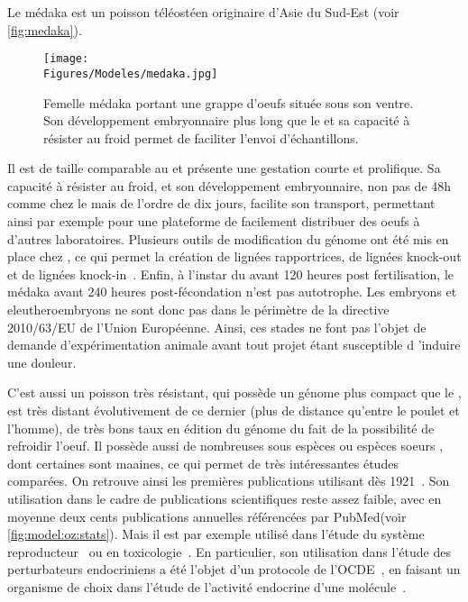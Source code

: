 \documentclass[\main/main.tex]{subfiles}
\begin{document}
%
Le médaka est un poisson téléostéen originaire d'Asie du Sud-Est (voir \autoref{fig:medaka}).

\begin{figure}[h!]
    \centering
    \texttt{[image: \\Figures/Modeles/medaka.jpg]}
    \caption{
    Femelle médaka portant une grappe d'oeufs située sous son ventre.
    \newline
    Son développement embryonnaire plus long que le \pz{} et sa capacité à résister au froid permet de faciliter l'envoi d'échantillons.
    }
    \label{fig:medaka}
\end{figure}

%
Il est de taille comparable au \pz{} et présente une gestation courte et prolifique.
%
Sa capacité à résister au froid, et son développement embryonnaire, non pas de 48h comme chez le \pz{} mais de l'ordre de dix jours,  facilite son transport, permettant ainsi par exemple pour une plateforme de facilement distribuer des oeufs à d'autres laboratoires.
%
Plusieurs outils de modification du génome ont été mis en place chez \ol{}\cite{kirchmaier_2015, ansai_2017},
ce qui permet la création de lignées rapportrices, de lignées knock-out et de lignées knock-in~\cite{abdelmoneim_2018,jin_2020,Watakabe_2018,qiu_2014,gay_2018}.
%
Enfin, à l'instar du \pz{} avant 120 heures post fertilisation,
le médaka avant 240 heures post-fécondation n'est pas autotrophe.
%
Les embryons et eleutheroembryons ne sont donc pas dans le périmètre de la directive 2010/63/EU de l'Union Européenne.
%
Ainsi, ces stades ne font pas l'objet de demande d'expérimentation animale avant tout projet étant susceptible d 'induire une douleur.

%
C'est aussi un poisson très résistant, qui possède un génome plus compact que le \pz{} , est très distant évolutivement de ce dernier (plus de distance qu'entre le poulet et l'homme), de très bons taux en édition du génome du fait de la possibilité de refroidir l'oeuf. Il possède aussi de nombreuses sous espèces ou espèces soeurs , dont certaines sont maaines, ce qui permet de très intéressantes études comparées.
%
On retrouve ainsi les premières publications utilisant \ol{} dès 1921~\cite{aida_1921}.
%
Son utilisation dans le cadre de publications scientifiques reste assez faible, avec en moyenne deux cents publications annuelles référencées par PubMed(voir \autoref{fig:model:oz:stats}).
%
Mais il est par exemple utilisé dans l'étude du système reproducteur~\cite{gay_2018,herberg_2018} ou
en toxicologie~\cite{carvan_2007,bertotto_2019,cleary_2019,powe_2018}.
%
En particulier, son utilisation dans l'étude des perturbateurs endocriniens a été l'objet d'un protocole de l'OCDE~\cite{oecd_2009}, en faisant un organisme de choix dans l'étude de l'activité endocrine d'une molécule~\cite{chen_2018,dang_2019,spirhanzlova_2016}.
\end{document}
